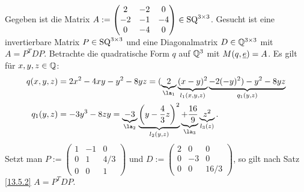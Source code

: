 \documentclass[../../main.tex]{subfiles}
\begin{document}
\begin{bsp}\label{13.5.3}
	Gegeben ist die Matrix $A:=\begin{pmatrix*}2&-2&0\\-2&-1&-4\\ 0&-4&0
	\end{pmatrix*}\in \SQ^{3\times 3}$. Gesucht ist eine invertierbare Matrix $P\in \operatorname{SQ}^{3\times 3}$ und eine Diagonalmatrix $D\in \mathbb Q^{3\times 3}$ mit $A=P^TDP$. Betrachte die quadratische Form $q$ auf $\mathbb Q^3$ mit $M(q,{\underline e})=A$. Es gilt für $x,y,z\in \mathbb Q$:
	\begin{align*}
		q(x,y,z)&=2x^2-4xy-y^2-8yz=(\underbrace{2}_{\la_1}\underbrace{(x-y)^2}_{l_1(x,y,z)}\underbrace{-2(-y)^2)-y^2-8yz}_{q_1(y,z)}\\
		q_1(y,z)&=-3y^3-8zy=\underbrace{-3}_{\la_2}\underbrace{\left(y-\frac{4}{3}z\right)^2}_{l_2(y,z)}\underbrace{+\frac{16}{9}}_{\la_3}\underbrace{z^2}_{l_3(z)}.
	\end{align*}
	Setzt man $P:=\begin{pmatrix}1&-1&0\\ 0 & 1 & 4/3\\ 0 & 0 & 1\end{pmatrix}$ und $D:=\begin{pmatrix*}2 & 0 & 0\\ 0 & -3 & 0\\ 0 & 0 &16/3\end{pmatrix*}$, so gilt nach Satz \ref{13.5.2} $A=P^TDP$.
\end{bsp}
\end{document}
